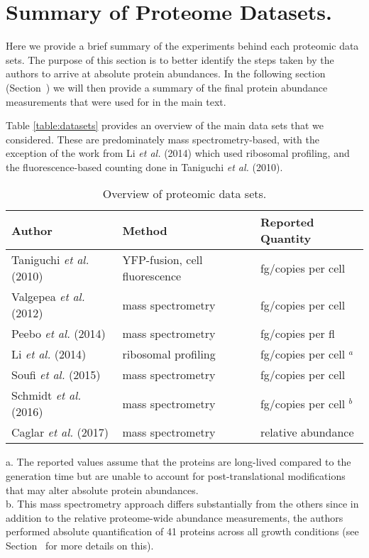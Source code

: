 

\section{Summary of Proteome Datasets.}
\label{sec:SI_exp_summary}

Here we provide a brief summary of the experiments behind each proteomic
data sets. The purpose of this section is to better identify the steps taken
by the authors to arrive at absolute protein abundances. In the following
section (Section~) we will then provide a summary of the
final protein abundance measurements that were used for in the main text.

Table \ref{table:datasets} provides an overview of the main data sets that
we considered. These are predominately mass spectrometry-based,
with the exception of the work from Li \textit{et al.} (2014) which used ribosomal
profiling, and the fluorescence-based counting done in Taniguchi \textit{et al.}
(2010).

\begin{table}[bt]
\caption{\label{tab:datasets}Overview of proteomic data sets.}
\begin{tabular}{l l l }
\toprule
Author & Method & Reported Quantity \\
\midrule
Taniguchi \textit{et al.} (2010)  & YFP-fusion, cell fluorescence    & fg/copies per cell      \\
Valgepea \textit{et al.} (2012)   & mass spectrometry                & fg/copies per cell      \\
Peebo \textit{et al.} (2014)      & mass spectrometry                & fg/copies per fl        \\
Li \textit{et al.} (2014)         & ribosomal profiling              & fg/copies per cell $^a$ \\
Soufi \textit{et al.} (2015)      & mass spectrometry                & fg/copies per cell      \\
Schmidt \textit{et al.} (2016)    & mass spectrometry                & fg/copies per cell $^b$ \\
Caglar \textit{et al.} (2017)     & mass spectrometry                & relative abundance      \\
\bottomrule
\end{tabular}

\medskip
a. The reported values assume that the proteins are long-lived compared to the generation time
but are unable to account for post-translational modifications that may alter absolute protein abundances.
\\
b. This mass spectrometry approach differs substantially from the others since in addition to
the relative proteome-wide abundance measurements, the authors performed absolute quantification of
41 proteins across all growth conditions (see Section~ for more details on this).
\end{table}

